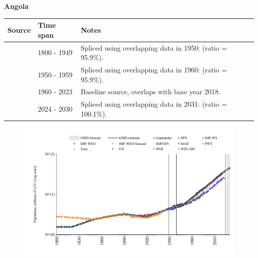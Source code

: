 \documentclass[12pt,a4paper,landscape]{article}
\begin{document}
\begin{adjustbox}{max totalsize={\paperwidth}{\paperheight},center}
\begin{minipage}[t][\textheight][t]{\textwidth}
\vspace*{0.5cm}
{}
\begin{center}
{\Large\bfseries Angola}
\end{center}
\vspace{0.5cm}
\begin{table}[H]
\centering
\small
\begin{tabular}{|l|l|l|}
\hline
\textbf{Source} & \textbf{Time span} & \textbf{Notes} \\
\hline
\rowcolor{white}\cite{Gapminder}& 1800 - 1949 &Spliced using overlapping data in 1950: (ratio = 95.9\%).\\
\rowcolor{lightgray}\cite{IMF_IFS}& 1950 - 1959 &Spliced using overlapping data in 1960: (ratio = 95.9\%).\\
\rowcolor{white}\cite{WDI}& 1960 - 2023 &Baseline source, overlaps with base year 2018.\\
\rowcolor{lightgray}\cite{Gapminder}& 2024 - 2030 &Spliced using overlapping data in 2031: (ratio = 100.1\%).\\
\hline
\end{tabular}
\end{table}
\begin{figure}[H]
\centering
\includegraphics[width=\textwidth,height=0.6\textheight,keepaspectratio]{graphs/AGO_pop.pdf}
\end{figure}
\end{minipage}
\end{adjustbox}
\end{document}
